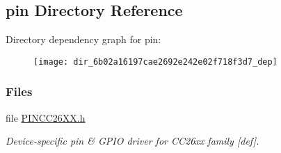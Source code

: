 \subsection{pin Directory Reference}
\label{dir_6b02a16197cae2692e242e02f718f3d7}
Directory dependency graph for pin\+:
\nopagebreak
\begin{figure}[H]
\begin{center}
\leavevmode
\texttt{[image: dir\_6b02a16197cae2692e242e02f718f3d7\_dep]}
\end{center}
\end{figure}
\subsubsection*{Files}
\begin{DoxyCompactItemize}
\item 
file \hyperlink{_p_i_n_c_c26_x_x_8h}{P\+I\+N\+C\+C26\+X\+X.\+h}
\begin{DoxyCompactList}\small\item\em Device-\/specific pin \& G\+P\+I\+O driver for C\+C26xx family \mbox{[}def\mbox{]}. \end{DoxyCompactList}\end{DoxyCompactItemize}
